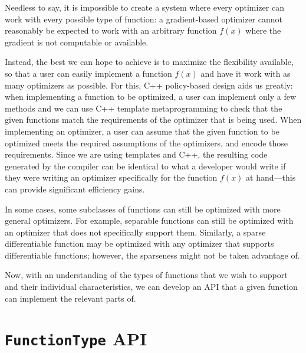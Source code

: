 \documentclass{article}
\begin{document}
Needless to say, it is impossible to create a system where every optimizer can
work with every possible type of function: a gradient-based optimizer cannot
reasonably be expected to work with an arbitrary function $f(x)$ where the
gradient is not computable or available.

Instead, the best we can hope to achieve is to maximize the flexibility
available, so that a user can easily implement a function $f(x)$ and have it
work with as many optimizers as possible.  For this, C++ policy-based design
aids us greatly: when implementing a function to be optimized, a user can
implement only a few methods and we can use C++ template metaprogramming to
check that the given functions match the requirements of the optimizer that is
being used.  When implementing an optimizer, a user can assume that the given
function to be optimized meets the required assumptions of the optimizers, and
encode those requirements.
Since we are using templates and C++, the resulting
code generated by the compiler can be identical to what a developer would write
if they were writing an optimizer specifically for the function $f(x)$ at
hand---this can provide significant efficiency gains.

In some cases, some subclasses of functions can still be optimized with more
general optimizers.  For example, separable functions can still be optimized
with an optimizer that does not specifically support them.  Similarly, a sparse
differentiable function may be optimized with any optimizer that supports
differentiable functions; however, the sparseness might not be taken advantage
of.

Now, with an understanding of the types of functions that we wish to support and
their individual characteristics, we can develop an API that a given function
can implement the relevant parts of.

\vspace*{-0.3em}
\section{{\tt FunctionType} API}
\vspace*{-0.2em}
\end{document}
